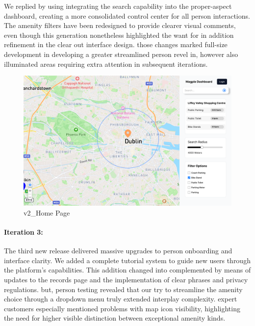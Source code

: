 We replied by using integrating the search capability into the proper-aspect dashboard, creating a more consolidated control center for all person interactions. The amenity filters have been redesigned to provide clearer visual comments, even though this generation nonetheless highlighted the want for in addition refinement in the clear out interface design. those changes marked full-size development in developing a greater streamlined person revel in, however also illuminated areas requiring extra attention in subsequent iterations.
\begin{figure}[h]
    \centering
    \begin{minipage}{0.48\textwidth}
        \centering
        \includegraphics[width=\textwidth]{images/v2_Home Page.png}
        \caption{v2\_Home Page}
        \label{fig:v2_Home Page}
    \end{minipage}
\end{figure}


\paragraph{Iteration 3:}
The third new release delivered massive upgrades to person onboarding and interface clarity. We added a complete tutorial system to guide new users through the platform's capabilities. This addition changed into complemented by means of updates to the records page and the implementation of clear phrases and privacy regulations. but, person testing revealed that our try to streamline the amenity choice through a dropdown menu truly extended interplay complexity. expert customers especially mentioned problems with map icon visibility, highlighting the need for higher visible distinction between exceptional amenity kinds.

